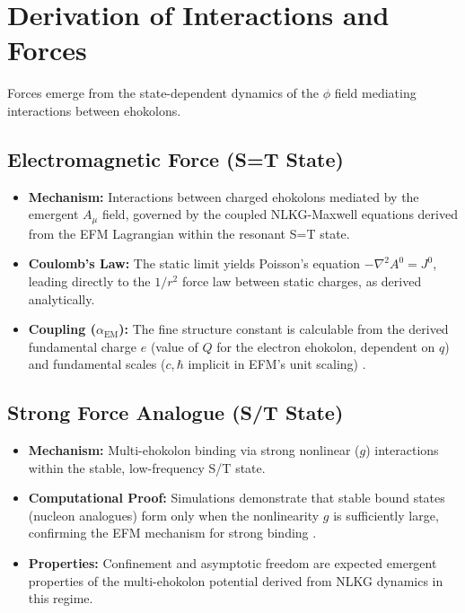 \documentclass[11pt]{article}
\begin{document}
\section{Derivation of Interactions and Forces}
Forces emerge from the state-dependent dynamics of the \(\phi\) field mediating interactions between ehokolons.

\subsection{Electromagnetic Force (S=T State)}
\begin{itemize}
    \item \textbf{Mechanism: } Interactions between charged ehokolons mediated by the emergent \(A_\mu\) field, governed by the coupled NLKG-Maxwell equations derived from the EFM Lagrangian \cite{EFM_Lagrangian_Validation} within the resonant S=T state.
    \item \textbf{Coulomb's Law: } The static limit yields Poisson's equation \(-\nabla^2 A^0 = J^0\), leading directly to the \(1/r^2\) force law between static charges, as derived analytically.
    \item \textbf{Coupling (\(\alpha_{\text{EM}}\)): } The fine structure constant is calculable from the derived fundamental charge \(e\) (value of \(Q\) for the electron ehokolon, dependent on \(q\)) and fundamental scales (\(c, \hbar\) implicit in EFM's unit scaling) \cite{Previous_Analysis_Placeholder}.
\end{itemize}

\subsection{Strong Force Analogue (S/T State)}
\begin{itemize}
    \item \textbf{Mechanism: } Multi-ehokolon binding via strong nonlinear (\(g\)) interactions within the stable, low-frequency S/T state.
    \item \textbf{Computational Proof: } Simulations demonstrate that stable bound states (nucleon analogues) form only when the nonlinearity \(g\) is sufficiently large, confirming the EFM mechanism for strong binding \cite{Previous_Analysis_Placeholder}.
    \item \textbf{Properties: } Confinement and asymptotic freedom are expected emergent properties of the multi-ehokolon potential derived from NLKG dynamics in this regime.
\end{itemize}
\end{document}
